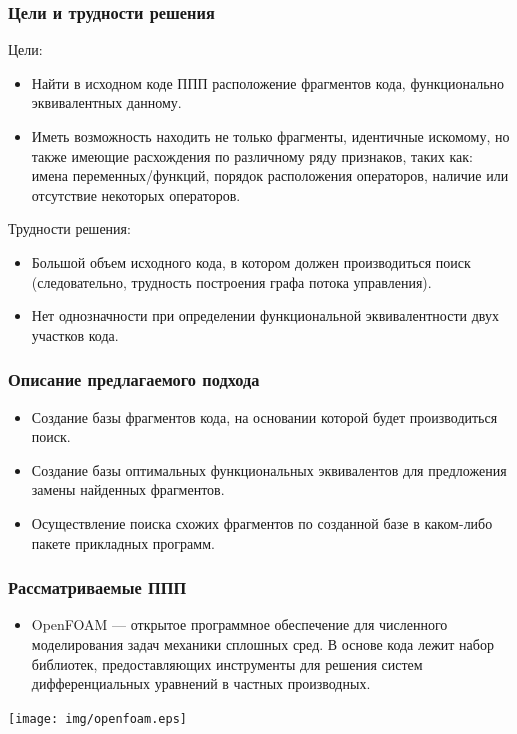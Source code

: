 \documentclass{beamer}
\begin{document}
\begin{frame}
\frametitle{Цели и трудности решения}
Цели: 
\begin{itemize}
	\item Найти в исходном коде ППП расположение фрагментов кода, функционально
эквивалентных данному.
	\item Иметь возможность находить не только фрагменты, идентичные искомому, но
также имеющие расхождения по различному ряду признаков, таких как: имена
переменных/функций, порядок расположения операторов, наличие или
отсутствие некоторых операторов.
\end{itemize}

Трудности решения: 
\begin{itemize}
	\item Большой объем исходного кода, в котором должен производиться поиск
(следовательно, трудность построения графа потока управления).
	\item Нет однозначности при определении функциональной эквивалентности двух
участков кода.
\end{itemize}
\end{frame}

\begin{frame}
\frametitle{Описание предлагаемого подхода}
\begin{itemize}
	\item Создание базы фрагментов кода, на основании которой будет производиться поиск.
	\item Создание базы оптимальных функциональных эквивалентов для предложения замены найденных фрагментов.
	\item Осуществление поиска схожих фрагментов по созданной базе в каком-либо пакете
прикладных программ.
\end{itemize}
\end{frame}

\begin{frame}
\frametitle{Рассматриваемые ППП}
\begin{itemize}
	\item OpenFOAM  ---
	 открытое программное обеспечение для численного моделирования задач механики
	 сплошных сред. В основе кода лежит набор библиотек, предоставляющих инструменты
	 для решения систем дифференциальных уравнений в частных производных. 
\end{itemize}
\begin{center}
\texttt{[image: img/openfoam.eps]}
\end{center}
\end{frame}
\end{document}
